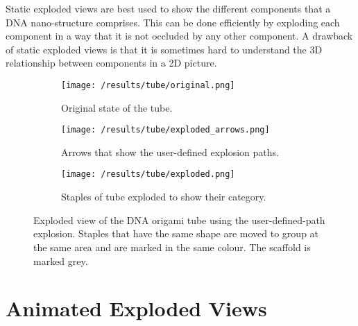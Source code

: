 \documentclass[draft,final]{vutinfth} %
\begin{document}
\par Static exploded views are best used to show the different components that a DNA nano-structure comprises. This can be done efficiently by exploding each component in a way that it is not occluded by any other component. A drawback of static exploded views is that it is sometimes hard to understand the 3D relationship between components in a 2D picture.

\begin{figure}
\centering
\begin{subfigure}{0.45\textwidth}
  \centering
  \texttt{[image: /results/tube/original.png]}
  \caption{Original state of the tube.}
  \label{fig:res_tube_o}
\end{subfigure}%
\quad
\begin{subfigure}{0.45\textwidth}
  \centering
  \texttt{[image: /results/tube/exploded\_arrows.png]}
  \caption{Arrows that show the user-defined explosion paths.}
  \label{fig:res_tube_e_a}
\end{subfigure}%

\medskip

\begin{subfigure}{0.63\textwidth}
  \centering
  \texttt{[image: /results/tube/exploded.png]}
  \caption{Staples of tube exploded to show their category.}
  \label{fig:res_tube_e}
\end{subfigure}%
\caption{Exploded view of the DNA origami tube using the user-defined-path explosion. Staples that have the same shape are moved to group at the same area and are marked in the same colour. The scaffold is marked grey.}
\label{fig:res_tube}
\end{figure}

\section{Animated Exploded Views}
\label{sec:animeEV}
\end{document}
